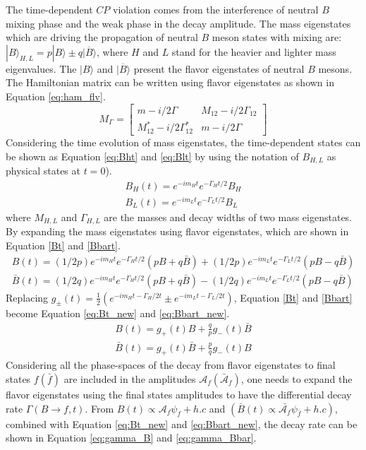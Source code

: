 The time-dependent $CP$ violation comes from the interference of neutral $B$ mixing phase and the weak phase in the decay amplitude. The mass eigenstates which are driving the propagation of neutral $B$ meson states with mixing are: $|B\rangle_{H,L}=p|B\rangle \pm q|\overline{B}\rangle $, where $H$ and $L$ stand for the heavier and lighter mass eigenvalues. The $|B\rangle$ and $|\overline{B}\rangle$ present the flavor eigenstates of neutral $B$ mesons.
The Hamiltonian matrix can be written using flavor eigenstates as shown in Equation \ref{eq:ham_flv}.
\begin{equation}\label{eq:ham_flv}
M_\Gamma=
\begin{bmatrix}
m-i/2\Gamma & M_{12}-i/2\Gamma_{12}\\
M^*_{12}-i/2\Gamma^*_{12}& m-i/2\Gamma 
\end{bmatrix}
\end{equation}
Considering the time evolution of mass eigenstates, the time-dependent states can be shown as Equation \ref{eq:Bht} and \ref{eq:Blt} by using the notation of $B_{H,L}$ as physical states at $t = 0$).
\begin{eqnarray}
B_H(t)=e^{-im_Ht}e^{-\Gamma_Ht/2}B_H \label{eq:Bht}\\
B_L(t)=e^{-im_Lt}e^{-\Gamma_Lt/2}B_L\label{eq:Blt}
\end{eqnarray}
where $M_{H,L}$ and $\Gamma_{H,L}$ are the masses and decay widths of two mass eigenstates. By expanding the mass eigenstates using flavor eigenstates, which are shown in Equation \ref{Bt} and \ref{Bbart}.
\begin{eqnarray}
B(t)=(1/2p)e^{-im_Ht}e^{-\Gamma_Ht/2}(pB+q\bar{B})+(1/2p)e^{-im_Lt}e^{-\Gamma_Lt/2}(pB-q\bar{B}) \label{Bt}\\
\bar{B}(t)=(1/2q)e^{-im_Ht}e^{-\Gamma_Ht/2}(pB+q\bar{B})-(1/2q)e^{-im_Lt}e^{-\Gamma_Lt/2}(pB-q\bar{B})\label{Bbart}
\end{eqnarray}
Replacing $g_{\pm}(t)=\frac{1}{2}(e^{-im_Ht-\Gamma_H/2t}\pm e^{-im_Lt-\Gamma_L/2t})$, Equation \ref{Bt} and \ref{Bbart} become Equation \ref{eq:Bt_new} and \ref{eq:Bbart_new}.
\begin{eqnarray}
B(t)=g_{+}(t)B +\frac{q}{p}g_{-}(t)\bar{B} \label{eq:Bt_new}\\
\bar{B}(t)=g_{+}(t)\bar{B} + \frac{p}{q}g_{-}(t){B}\label{eq:Bbart_new}
\end{eqnarray}
Considering all the phase-spaces of the decay from flavor eigenstates to final states $f(\bar{f})$ are included in the amplitudes $\mathcal{A}_f (\bar{\mathcal{A}}_f)$, one needs to expand the flavor eigenstates using the final states amplitudes to have the differential decay rate $\Gamma(B\to f,t)$. From $B(t) \propto \mathcal{A}_f\psi_f+h.c $ and $ (\bar{B}(t) \propto \bar{\mathcal{A}_f}\psi_{\bar{f}}+h.c)$, combined with Equation \ref{eq:Bt_new} and \ref{eq:Bbart_new}, the decay rate can be shown in Equation \ref{eq:gamma_B} and \ref{eq:gamma_Bbar}.
